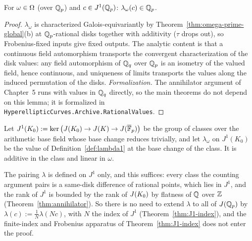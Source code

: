 \begin{lemma}
\label{lem:values-rational}
\leanok
{}
For $\omega \in \Omega$ (over $\mathbb{Q}_p$) and $c \in J^1(\mathbb{Q}_p)$:
$\lambda_\omega(c) \in \mathbb{Q}_p$.
\end{lemma}
\begin{proof}
\leanok
$\lambda_\omega$ is characterized Galois-equivariantly by
Theorem~\ref{thm:omega-prime-global}(b) at $\mathbb{Q}_p$-rational disks together with
additivity ($\tau$ drops out), so Frobenius-fixed inputs give fixed outputs. The
analytic content is that a continuous field automorphism transports the convergent
characterization of the disk values: any field automorphism of $\mathbb{Q}_q$ over $\mathbb{Q}_p$ is an
isometry of the valued field, hence continuous, and uniqueness of limits transports the
values along the induced permutation of the disks. \emph{Formalization.} The
annihilator argument of Chapter~5 runs with values in $\mathbb{Q}_q$ directly, so the main theorems
do not depend on this lemma; it is formalized in
\texttt{HyperellipticCurves.Archive.RationalValues}.
\end{proof}

\begin{definition}
\label{def:lambda}
\leanok
{}
Let $J^1(K_0) := \ker\big(J(K_0) \to J(K) \to J(\overline{\mathbb{F}}_p)\big)$ be the group of
classes over the arithmetic base field whose base change reduces trivially, and let
$\lambda_\omega$ on $J^1(K_0)$ be the value of Definition~\ref{def:lambda1} at the base
change of the class. It is additive in the class and linear in $\omega$.
\end{definition}

\begin{remark}[Formalization]
The pairing $\lambda$ is defined on $J^1$ only, and this suffices: every class the
counting argument pairs is a same-disk difference of rational points, which lies in
$J^1$, and the rank of $J^1$ is bounded by the rank of $J(K_0)$ by flatness of $\mathbb{Q}$
over $\mathbb{Z}$ (Theorem~\ref{thm:annihilator}). So there is no need to extend $\lambda$ to
all of $J(\mathbb{Q}_p)$ by $\lambda(c) := \tfrac1N \lambda(Nc)$, with $N$ the index of $J^1$
(Theorem~\ref{thm:J1-index}), and the finite-index and Frobenius apparatus of
Theorem~\ref{thm:J1-index} does not enter the proof.
\end{remark}

